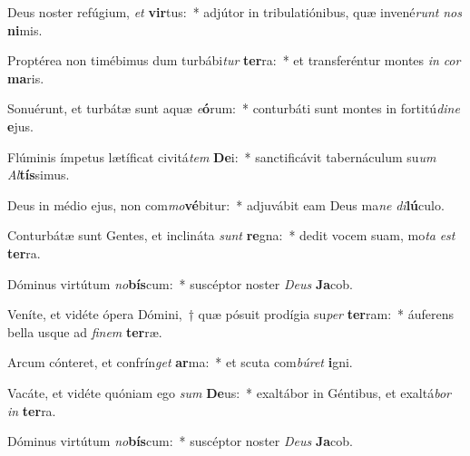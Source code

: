 \item Deus noster refúgium, \textit{et} \textbf{vir}tus:~* adjútor in tribulatiónibus, quæ invené\textit{runt} \textit{nos} \textbf{ni}mis.
\item Proptérea non timébimus dum turbábi\textit{tur} \textbf{ter}ra:~* et transferéntur montes \textit{in} \textit{cor} \textbf{ma}ris.
\item Sonuérunt, et turbátæ sunt aquæ \textit{e}\textbf{ó}rum:~* conturbáti sunt montes in fortitú\textit{di}\textit{ne} \textbf{e}jus.
\item Flúminis ímpetus lætíficat civitá\textit{tem} \textbf{De}i:~* sanctificávit tabernáculum su\textit{um} \textit{Al}\textbf{tís}simus.
\item Deus in médio ejus, non com\textit{mo}\textbf{vé}bitur:~* adjuvábit eam Deus ma\textit{ne} \textit{di}\textbf{lú}culo.
\item Conturbátæ sunt Gentes, et inclináta \textit{sunt} \textbf{re}gna:~* dedit vocem suam, mo\textit{ta} \textit{est} \textbf{ter}ra.
\item Dóminus virtútum \textit{no}\textbf{bís}cum:~* suscéptor noster \textit{De}\textit{us} \textbf{Ja}cob.
\item Veníte, et vidéte ópera Dómini,~† quæ pósuit prodígia su\textit{per} \textbf{ter}ram:~* áuferens bella usque ad \textit{fi}\textit{nem} \textbf{ter}ræ.
\item Arcum cónteret, et confrín\textit{get} \textbf{ar}ma:~* et scuta com\textit{bú}\textit{ret} \textbf{i}gni.
\item Vacáte, et vidéte quóniam ego \textit{sum} \textbf{De}us:~* exaltábor in Géntibus, et exaltá\textit{bor} \textit{in} \textbf{ter}ra.
\item Dóminus virtútum \textit{no}\textbf{bís}cum:~* suscéptor noster \textit{De}\textit{us} \textbf{Ja}cob.
